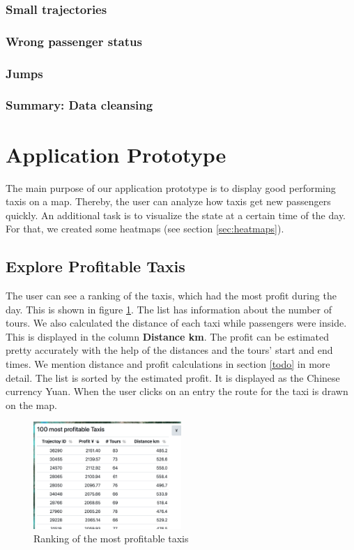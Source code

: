 \documentclass[10pt]{sig-alternate}
\begin{document}
\subsubsection{Small trajectories}
\subsubsection{Wrong passenger status}
\subsubsection{Jumps}
\subsubsection{Summary: Data cleansing}

\section{Application Prototype}

The main purpose of our application prototype is to display good performing taxis on a map. Thereby, the user can analyze how taxis get new passengers quickly. An additional task is to visualize the state at a certain time of the day. For that, we created some heatmaps (see section \ref{sec:heatmaps}).

\subsection{Explore Profitable Taxis}

The user can see a ranking of the taxis, which had the most profit during the day. This is shown in figure \ref{fig:ranking}. The list has information about the number of tours. We also calculated the distance of each taxi while passengers were inside. This is displayed in the column \textbf{Distance km}. The profit can be estimated pretty accurately with the help of the distances and the tours' start and end times. We mention distance and profit calculations in section \ref{todo} in more detail. The list is sorted by the estimated profit. It is displayed as the Chinese currency Yuan. When the user clicks on an entry the route for the taxi is drawn on the map.\\

\begin{figure}[ht]
\centering
\includegraphics[width=0.5\textwidth]{img/ranking.png}
\caption{Ranking of the most profitable taxis}
\label{fig:ranking}
\end{figure}
\end{document}
